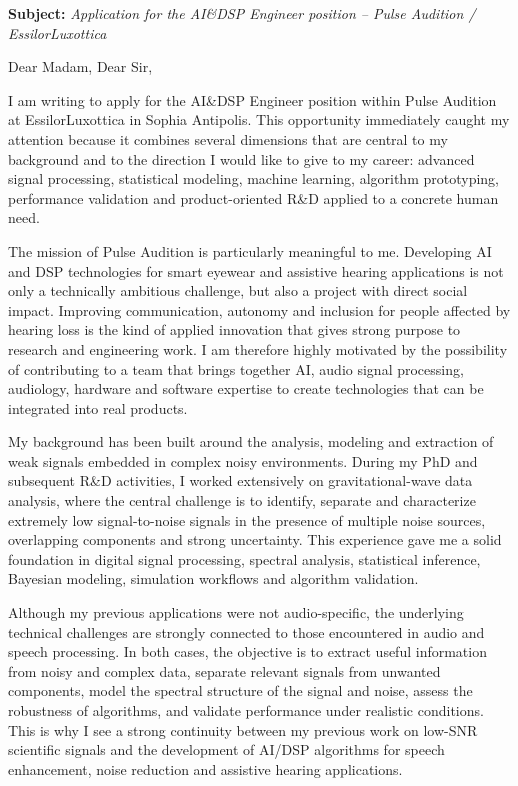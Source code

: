 \documentclass[11pt,a4paper]{../_shared/altacv}
\begin{document}
\makecvheader
\vspace{-0.6cm}

\vspace{-0.4cm}

{\color{accent}\textbf{Subject:}} \textit{Application for the AI\&DSP Engineer position -- Pulse Audition / EssilorLuxottica}

{\color{body}

Dear Madam, Dear Sir,

I am writing to apply for the AI\&DSP Engineer position within Pulse Audition at EssilorLuxottica in Sophia Antipolis. This opportunity immediately caught my attention because it combines several dimensions that are central to my background and to the direction I would like to give to my career: advanced signal processing, statistical modeling, machine learning, algorithm prototyping, performance validation and product-oriented R\&D applied to a concrete human need.

The mission of Pulse Audition is particularly meaningful to me. Developing AI and DSP technologies for smart eyewear and assistive hearing applications is not only a technically ambitious challenge, but also a project with direct social impact. Improving communication, autonomy and inclusion for people affected by hearing loss is the kind of applied innovation that gives strong purpose to research and engineering work. I am therefore highly motivated by the possibility of contributing to a team that brings together AI, audio signal processing, audiology, hardware and software expertise to create technologies that can be integrated into real products.

My background has been built around the analysis, modeling and extraction of weak signals embedded in complex noisy environments. During my PhD and subsequent R\&D activities, I worked extensively on gravitational-wave data analysis, where the central challenge is to identify, separate and characterize extremely low signal-to-noise signals in the presence of multiple noise sources, overlapping components and strong uncertainty. This experience gave me a solid foundation in digital signal processing, spectral analysis, statistical inference, Bayesian modeling, simulation workflows and algorithm validation.

Although my previous applications were not audio-specific, the underlying technical challenges are strongly connected to those encountered in audio and speech processing. In both cases, the objective is to extract useful information from noisy and complex data, separate relevant signals from unwanted components, model the spectral structure of the signal and noise, assess the robustness of algorithms, and validate performance under realistic conditions. This is why I see a strong continuity between my previous work on low-SNR scientific signals and the development of AI/DSP algorithms for speech enhancement, noise reduction and assistive hearing applications.

}
\end{document}
